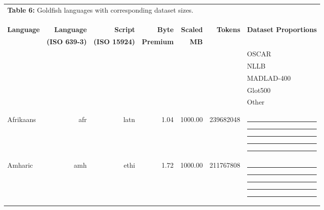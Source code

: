 \documentclass[11pt]{article}
\begin{document}
\onecolumn
{}
\footnotesize
\begin{center}
\setlength\tabcolsep{0.1cm}
\begin{longtable}[width=0.9\textwidth]{|lrrrrrl|}
\multicolumn{7}{l}{\textbf{Table 6:} Goldfish languages with corresponding dataset sizes.} \\
\multicolumn{7}{l}{} \\
\hline
\vspace{-0.25cm} & & & & & & \\
\endfirsthead
\hline
\vspace{-0.25cm} & & & & & & \\
\endhead
\hline
\endfoot
\label{tab:lang-list}
\textbf{Language} \phantom{\rule{0.2cm}{6pt}} & \textbf{Language} & \textbf{Script} & \textbf{Byte} & \textbf{Scaled} & \textbf{Tokens} & \textbf{Dataset Proportions} \\
& \textbf{(ISO 639-3)} & \textbf{(ISO 15924)} & \textbf{Premium} & \textbf{MB} & & \\
& & & & & & \hspace{0.2cm}{\color{oscar}\rule{5pt}{5pt}} OSCAR \\
& & & & & & \hspace{0.2cm}{\color{nllb}\rule{5pt}{5pt}} NLLB \\
& & & & & & \hspace{0.2cm}{\color{madlad400}\rule{5pt}{5pt}} MADLAD-400 \\
& & & & & & \hspace{0.2cm}{\color{glot500}\rule{5pt}{5pt}} Glot500 \\
& & & & & & \hspace{0.2cm}{\color{other}\rule{5pt}{5pt}} Other \\
\vspace{-0.25cm} & & & & & & \\
\hline
\vspace{-0.25cm} & & & & & & \\
Afrikaans & afr & latn & 1.04 & 1000.00 & 239682048 & {\color{oscar}\rule{0.09cm}{8pt}}{\color{nllb}\rule{0.52cm}{8pt}}{\color{madlad400}\rule{2.64cm}{8pt}}{\color{glot500}\rule{0.65cm}{8pt}}{\color{other}\rule{0.10000000000000009cm}{8pt}} \\ 
Amharic & amh & ethi & 1.72 & 1000.00 & 211767808 & {\color{oscar}\rule{0.26cm}{8pt}}{\color{nllb}\rule{0.92cm}{8pt}}{\color{madlad400}\rule{1.36cm}{8pt}}{\color{glot500}\rule{1.44cm}{8pt}}{\color{other}\rule{0.020000000000000018cm}{8pt}} \\ 

\end{longtable}
\end{center}
\end{document}
